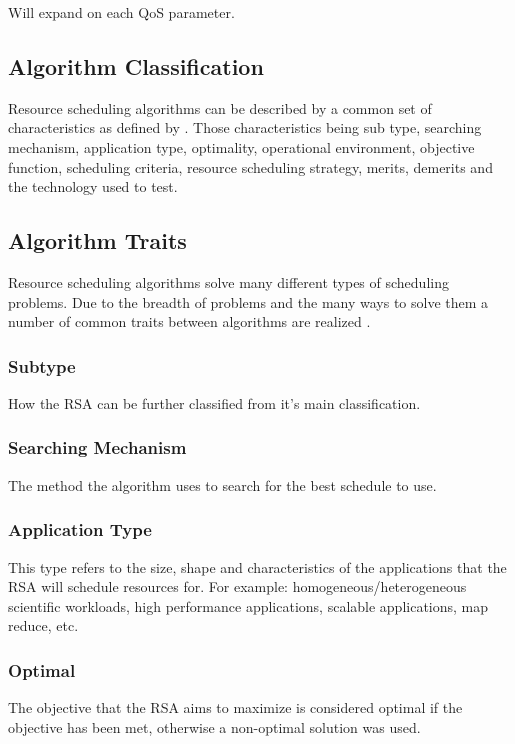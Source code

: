 \documentclass[12pt]{article}
\begin{document}
Will expand on each QoS parameter.

\subsection{Algorithm Classification} \label{sub:algclassification}


Resource scheduling algorithms can be described by a common set of characteristics as defined by \textcite{Singh2016}. Those characteristics being sub type, searching mechanism, application type, optimality, operational environment, objective function, scheduling criteria, resource scheduling strategy, merits, demerits and the technology used to test.

\subsection{Algorithm Traits} \label{sub:algtraits}

Resource scheduling algorithms solve many different types of scheduling problems. Due to the breadth of problems and the many ways to solve them a number of common traits between algorithms are realized \cite{Singh2016}.

\subsubsection{Subtype} How the RSA can be further classified from it's main classification.

\subsubsection{Searching Mechanism} The method the algorithm uses to search for the best schedule to use.

\subsubsection{Application Type} This type refers to the size, shape and characteristics of the applications that the RSA will schedule resources for. For example: homogeneous/heterogeneous scientific workloads, high performance applications, scalable applications, map reduce, etc.

\subsubsection{Optimal} The objective that the RSA aims to maximize is considered optimal if the objective has been met, otherwise a non-optimal solution was used.
\end{document}
